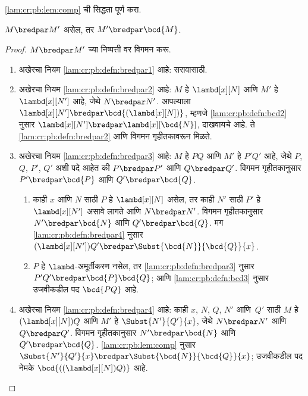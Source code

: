 \begin{prob}
  \ref{lam:cr:pb:lem:comp} ची सिद्धता पूर्ण करा.
\end{prob}

\begin{lem}\label{lam:cr:pb:lem:cont}
  $M \bredpar M'$ असेल, तर $M' \bredpar \bcd{M}$.
\end{lem}
\begin{proof}
  $M \bredpar M'$ च्या निष्पत्ती वर विगमन करू.
  \begin{enumerate}
    \item अखेरचा नियम \ref{lam:cr:pb:defn:bredpar1} आहे: सरावासाठी.
    \item अखेरचा नियम \ref{lam:cr:pb:defn:bredpar2} आहे: $M$ हे
      $\lambd[x][N]$ आणि $M'$ हे $\lambd[x][N']$ आहे,
      जेथे $N \bredpar N'$. आपल्याला $\lambd[x][N'] \bredpar
      \bcd{(\lambd[x][N])}$, म्हणजे \ref{lam:cr:pb:defn:bcd2} नुसार
      $\lambd[x][N'] \bredpar \lambd[x][\bcd{N}]$,
      दाखवायचे आहे. ते \ref{lam:cr:pb:defn:bredpar2} आणि
      विगमन गृहीतकावरून मिळते.
    \item अखेरचा नियम \ref{lam:cr:pb:defn:bredpar3} आहे: $M$ हे $PQ$
      आणि $M'$ हे $P'Q'$ आहे, जेथे $P$, $Q$, $P'$, $Q'$
      अशी पदे आहेत की $P \bredpar P'$ आणि $Q \bredpar Q'$.
      विगमन गृहीतकानुसार $P' \bredpar \bcd{P}$ आणि
      $Q' \bredpar \bcd{Q}$.
      \begin{enumerate}
        \item काही $x$ आणि $N$ साठी $P$ हे $\lambd[x][N]$
          असेल, तर काही $N'$ साठी $P'$ हे $\lambd[x][N']$
          असावे लागते आणि $N \bredpar N'$. विगमन गृहीतकानुसार
          $N' \bredpar \bcd{N}$ आणि $Q' \bredpar \bcd{Q}$.
          मग \ref{lam:cr:pb:defn:bredpar4} नुसार
          $(\lambd[x][N'])Q' \bredpar
          \Subst{\bcd{N}}{\bcd{Q}}{x}$.
        \item $P$ हे $\lambd$-अमूर्तीकरण नसेल, तर
          \ref{lam:cr:pb:defn:bredpar3} नुसार $P'Q' \bredpar
          \bcd{P}\bcd{Q}$; आणि \ref{lam:cr:pb:defn:bcd3} नुसार
          उजवीकडील पद $\bcd{PQ}$ आहे.
      \end{enumerate}
    \item अखेरचा नियम \ref{lam:cr:pb:defn:bredpar4} आहे: काही
      $x$, $N$, $Q$, $N'$ आणि~$Q'$ साठी $M$ हे
      $(\lambd[x][N])Q$ आणि $M'$ हे $\Subst{N'}{Q'}{x}$,
      जेथे $N \bredpar N'$ आणि $Q \bredpar Q'$.
      विगमन गृहीतकानुसार $N' \bredpar \bcd{N}$ आणि
      $Q' \bredpar \bcd{Q}$. \ref{lam:cr:pb:lem:comp} नुसार
      $\Subst{N'}{Q'}{x} \bredpar \Subst{\bcd{N}}{\bcd{Q}}{x}$;
      उजवीकडील पद नेमके $\bcd{((\lambd[x][N])Q)}$ आहे.
  \end{enumerate}
\end{proof}

